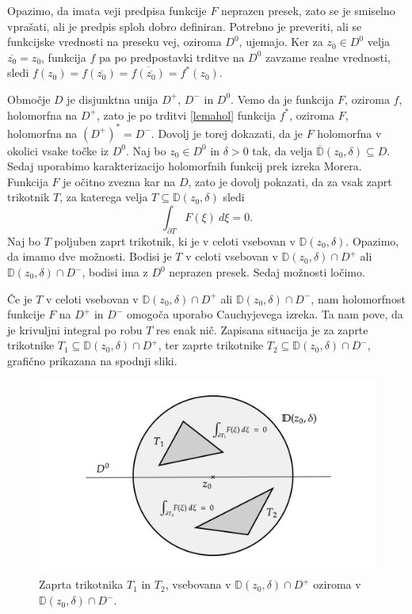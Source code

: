 \documentclass[mat1, tisk]{fmfdelo}
\begin{document}
    \begin{dokaz}
        Opazimo, da imata veji predpisa funkcije $F$ neprazen presek, zato se je smiselno vprašati, ali je predpis sploh dobro definiran. Potrebno je preveriti, ali se funkcijske vrednosti na preseku vej, oziroma $D^0$, ujemajo.  
        Ker za $z_0 \in D^0$ velja $\overline{z_0} = z_0$, funkcija $f$ pa po predpostavki trditve na $D^0$ zavzame realne vrednosti, sledi $f(z_0) = f(\overline{z_0}) = \overline{f(\overline{z_0})} = f^*(z_0)$.
        
        Območje $D$ je disjunktna unija $D^+$, $D^-$ in $D^0$. Vemo da je funkcija $F$, oziroma $f$, holomorfna na $D^+$, zato je po trditvi \ref{lemahol} funkcija $f^*$, oziroma $F$, holomorfna na $(D^+)^* = D^-$. 
        Dovolj je torej dokazati, da je $F$ holomorfna v okolici vsake točke iz $D^0$. 
        Naj bo $z_0 \in D^0$ in $\delta > 0$ tak, da velja $\overline{\mathbb{D}}(z_0,\delta) \subseteq D$. Sedaj uporabimo karakterizacijo holomorfnih funkcij prek izreka Morera. 
        Funkcija $F$ je očitno zvezna kar na $D$, zato je dovolj pokazati, da za vsak zaprt trikotnik $T$, za katerega velja $T \subseteq \mathbb{D}(z_0, \delta)$ sledi
        $$ 
            \int_{\partial T}{F(\xi)~d\xi} = 0.
        $$
        Naj bo $T$ poljuben zaprt trikotnik, ki je v celoti vsebovan v $\mathbb{D}(z_0,\delta)$. Opazimo, da imamo dve možnosti.
        Bodisi je $T$ v celoti vsebovan v $\mathbb{D}(z_0,\delta) \cap D^+$ ali $\mathbb{D}(z_0,\delta) \cap D^-$, bodisi ima z $D^0$ neprazen presek. Sedaj možnosti ločimo.
        
        Če je $T$ v celoti vsebovan v $\mathbb{D}(z_0,\delta) \cap D^+$ ali $\mathbb{D}(z_0,\delta) \cap D^-$, nam holomorfnost funkcije $F$ na $D^+$ in $D^-$ omogoča uporabo Cauchyjevega izreka. 
        Ta nam pove, da je krivuljni integral po robu $T$ res enak nič. 
        Zapisana situacija je za zaprte trikotnike $T_1 \subseteq \mathbb{D}(z_0,\delta) \cap D^+$, ter zaprte trikotnike $T_2 \subseteq \mathbb{D}(z_0,\delta) \cap D^-$, grafično prikazana na spodnji sliki. 
        \begin{figure}[H]
            \begin{center}
                \includegraphics[width = 0.9 \textwidth]{schwarz_hol_1.png}
                \caption{Zaprta trikotnika $T_1$ in $T_2$, vsebovana v $\mathbb{D}(z_0,\delta) \cap D^+$ oziroma v $\mathbb{D}(z_0,\delta) \cap D^-$.}
            \end{center}    
        \end{figure}


\end{dokaz}
\end{document}
